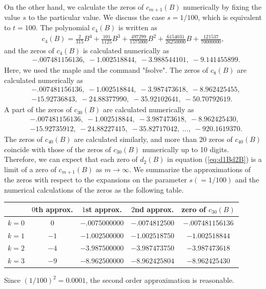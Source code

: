 \documentclass[12pt]{amsart}
\numberwithin{equation}{section}
\theoremstyle{definition}
\theoremstyle{remark}
\begin{document}
On the other hand, we calculate the zeros of $c_{m+1} (B)$ numerically by fixing the value $s$ to the particular value.
We discuss the case $s=1/100$, which is equivalent to $t=100$.
The polynomial $c_4 (B)$ is written as
\begin{align}
 c_{4}(B) = \frac{2}{315} B^4 +\frac{101}{1125}B^3 +\frac{497299}{1575000}B^2 +\frac{6154031}{26250000}B +\frac{121537}{70000000},
\end{align}
and the zeros of $c_{4}(B) $ is calculated numerically as
\begin{align*}
& -.007481156136, \; -1.002518844, \; -3.988544101, \; -9.141455899 .
\end{align*}
Here, we used the maple and the command "fsolve".
The zeros of $c_{8} (B)$ are calculated numerically as
\begin{align*}
& -.007481156136, \; -1.002518844, \; -3.987473618, \; -8.962425455, \\
& -15.92736843 , \; -24.88377990, \; -35.92102641, \; -50.70792619.
\end{align*}
A part of the zeros of $c_{30} (B)$ are calculated numerically as
\begin{align*}
& -.007481156136, \; -1.002518844, \; -3.987473618, \; -8.962425430, \\
& -15.92735912 , \; -24.88227415, \; -35.82717042, \; \dots , \; -920.1619370 .
\end{align*}
The zeros of $c_{40} (B)$ are calculated similarly, and more than 20 zeros of $c_{40} (B)$ coincide with those of the zeros of $c_{30} (B)$ numerically up to 10 digits.
Therefore, we can expect that each zero of $d_2 (B)$ in equation (\ref{eq:d1Bd2B}) is a limit of a zero of $c_{m+1} (B)$ as $m \to \infty $.
We summarize the approximations of the zeros with respect to the expansions on the parameter $s(=1/100)$ and the numerical calculations of the zeros as the following table.
\begin{center}
\begin{tabular}{c|c|c|c|c}
& $0$th approx. & $1$st approx. & $2$nd approx. & zero of $ c_{30} (B) $ \\ \hline
$k=0$ & $0$ & $-.0075000000 $ & $-.0074812500 $ & $-.007481156136$ \\
$k=1$ & $-1$ & $-1.002500000 $ & $-1.002518750 $ & $-1.002518844$ \\
$k=2$ & $-4$ & $-3.987500000 $ & $-3.987473750 $ & $-3.987473618$ \\
$k=3$ & $-9$ & $-8.962500000 $ & $-8.962425804 $ & $-8.962425430$
\end{tabular}
\end{center}
Since $(1/100)^2=0.0001$, the second order approximation is reasonable.
\end{document}
